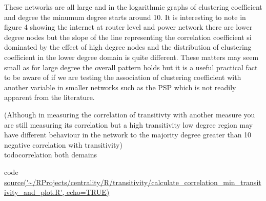 These networks are all large and in the logarithmic graphs of clustering coefficient and degree the minumum degree starts around 10. It is interesting to note in figure 4 showing the internet at router level and power network there are lower degree nodes but the slope of the line representing the correlation coefficient si dominated by the effect of high degree nodes and the distribution of clustering coefficient in the lower degree domain is quite different. These matters may seem small as for large degree the overall pattern holds but it is a useful practical fact to be aware of if we are testing the association of clustering coefficient with another variable in smaller networks such as the PSP which is not readily apparent from the literature.

(Although in measuring the correlation of transitivty with another measure you are still measuring its correlation but a high transitivity low degree region may have different behaviour in the network to the majority degree greater than 10 negative correlation with transitivity)\\todo{correlation both demains}

code \url{source('~/RProjects/centrality/R/transitivity/calculate_correlation_min_transitivity_and_plot.R', echo=TRUE)}

